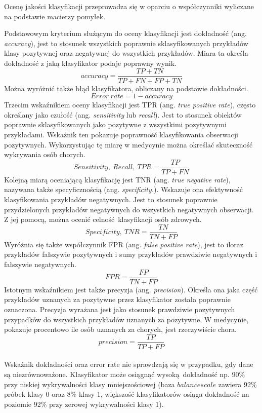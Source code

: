 Ocenę jakości klasyfikacji przeprowadza się w oparciu o współczynniki wyliczane na podstawie macierzy pomyłek.\par
Podstawowym kryterium służącym do oceny klasyfikacji jest dokładność (ang. \textit{accuracy}), jest to stosunek wszystkich poprawnie sklasyfikowanych przykładów klasy pozytywnej oraz negatywnej do wszystkich przykładów. Miara ta określa dokładność z jaką klasyfikator podaje poprawny wynik.
\[accuracy = \frac{TP + TN}{TP + FN + FP + TN}\]
Można wyróżnić także błąd klasyfikatora, obliczany na podstawie dokładności.
\[Error\ rate = 1 - accuracy\label{error_rate}\]
Trzecim wskaźnikiem oceny klasyfikacji jest TPR (ang. \textit{true positive rate}), często określany jako czułość (ang. \textit{sensitivity} lub \textit{recall}). Jest to stosunek obiektów poprawnie sklasyfikowanych jako pozytywne z wszystkimi pozytywnymi przykładami. Wskaźnik ten pokazuje poprawność klasyfikowania obserwacji pozytywnych. Wykorzystując tę miarę w medycynie można określać skuteczność wykrywania osób chorych.
\[Sensitivity,\ Recall,\ TPR = \frac{TP}{TP + FN}\]
Kolejną miarą oceniającą klasyfikację jest TNR (ang. \textit{true negative rate}), nazywana także specyficznością (ang. \textit{specificity.}). Wskazuje ona efektywność klasyfikowania przykładów negatywnych. Jest to stosunek poprawnie przydzielonych przykładów negatywnych do wszystkich negatywnych obserwacji. Z jej pomocą, można ocenić celność klasyfikacji osób zdrowych.
\[Specificity,\ TNR = \frac{TN}{TN + FP}\]
Wyróżnia się także współczynnik FPR (ang. \textit{false positive rate}), jest to iloraz przykładów fałszywie pozytywnych i sumy przykładów prawdziwie negatywnych i fałszywie negatywnych.
\[FPR = \frac{FP}{TN + FP}\]
Istotnym wskaźnikiem jest także precyzja (ang. \textit{precision}). Określa ona jaka część przykładów uznanych za pozytywne przez klasyfikator została poprawnie oznaczona. Precyzja wyrażana jest jako stosunek prawdziwie pozytywnych przypadków do wszystkich przykładów uznanych za pozytywne. W medycynie, pokazuje procentowo ile osób uznanych za chorych, jest rzeczywiście chora.
\[precision = \frac{TP}{TP + FP}\]\\
Wskaźnik dokładności oraz error rate nie sprawdzają się w przypadku, gdy dane są niezrównoważone. Klasyfikator może osiągnąć wysoką dokładność np. 90\% przy niskiej wykrywalności klasy mniejszościowej (baza $balance scale$ zawiera 92\% próbek klasy 0 oraz 8\% klasy 1, większość klasyfikatorów osiąga dokładność na poziomie 92\% przy zerowej wykrywalności klasy 1).

